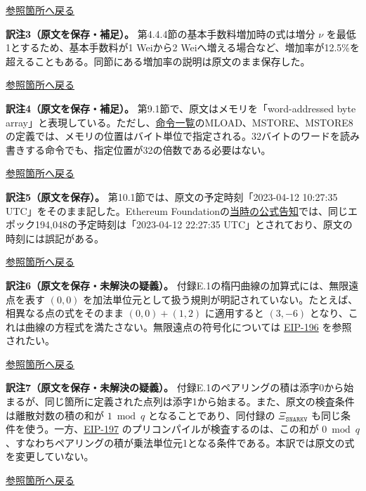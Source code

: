 \documentclass[
]{ltjsarticle}
\begin{document}
\protect\hyperlink{tnref-2}{参照箇所へ戻る}

\leavevmode{}%
\textbf{訳注3（原文を保存・補足）。}
第4.4.4節の基本手数料増加時の式は増分 \(\nu\)
を最低1とするため、基本手数料が1 Weiから2
Weiへ増える場合など、増加率が12.5\%を超えることもある。同節にある増加率の説明は原文のまま保存した。

\protect\hyperlink{tnref-3}{参照箇所へ戻る}

\leavevmode{}%
\textbf{訳注4（原文を保存・補足）。}
第9.1節で、原文はメモリを「word-addressed byte
array」と表現している。ただし、\protect\hyperlink{subsec:instruction-set}{命令一覧}のMLOAD、MSTORE、MSTORE8の定義では、メモリの位置はバイト単位で指定される。32バイトのワードを読み書きする命令でも、指定位置が32の倍数である必要はない。

\protect\hyperlink{tnref-4}{参照箇所へ戻る}

\leavevmode{}%
\textbf{訳注5（原文を保存）。} 第10.1節では、原文の予定時刻「2023-04-12
10:27:35 UTC」をそのまま記した。Ethereum
Foundationの\href{https://blog.ethereum.org/2023/03/28/shapella-mainnet-announcement}{当時の公式告知}では、同じエポック194,048の予定時刻は「2023-04-12
22:27:35 UTC」とされており、原文の時刻には誤記がある。

\protect\hyperlink{tnref-5}{参照箇所へ戻る}

\leavevmode{}%
\textbf{訳注6（原文を保存・未解決の疑義）。}
付録E.1の楕円曲線の加算式には、無限遠点を表す \((0,0)\)
を加法単位元として扱う規則が明記されていない。たとえば、相異なる点の式をそのまま
\((0,0)+(1,2)\) に適用すると \((3,-6)\)
となり、これは曲線の方程式を満たさない。無限遠点の符号化については
\href{https://eips.ethereum.org/EIPS/eip-196\#encoding}{EIP-196}
を参照されたい。

\protect\hyperlink{tnref-6}{参照箇所へ戻る}

\leavevmode{}%
\textbf{訳注7（原文を保存・未解決の疑義）。}
付録E.1のペアリングの積は添字0から始まるが、同じ箇所に定義された点列は添字1から始まる。また、原文の検査条件は離散対数の積の和が
\(1\bmod q\) となることであり、同付録の \(\Xi_{\mathtt{SNARKV}}\)
も同じ条件を使う。一方、\href{https://eips.ethereum.org/EIPS/eip-197\#specification}{EIP-197}
のプリコンパイルが検査するのは、この和が \(0\bmod q\)
、すなわちペアリングの積が乗法単位元1となる条件である。本訳では原文の式を変更していない。

\protect\hyperlink{tnref-7}{参照箇所へ戻る}
\end{document}
